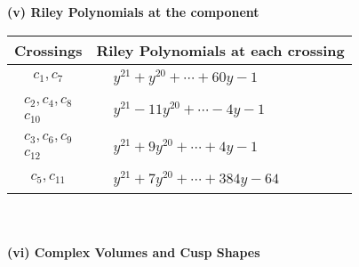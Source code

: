 \documentclass[1p]{elsarticle_modified}
\theoremstyle{definition}
\begin{document}
\newpage\renewcommand{\arraystretch}{1}
\flushleft \textbf{(v) Riley Polynomials at the component}\newline \\
\begin{tabular}{m{50pt}|m{274pt}}
Crossings & \hspace{64pt}Riley Polynomials at each crossing \\
\hline $$\begin{aligned}c_{1},c_{7}\end{aligned}$$&$\begin{aligned}
&y^{21}+y^{20}+\cdots+60 y-1
\end{aligned}$\\
\hline $$\begin{aligned}c_{2},c_{4},c_{8}\\c_{10}\end{aligned}$$&$\begin{aligned}
&y^{21}-11 y^{20}+\cdots-4 y-1
\end{aligned}$\\
\hline $$\begin{aligned}c_{3},c_{6},c_{9}\\c_{12}\end{aligned}$$&$\begin{aligned}
&y^{21}+9 y^{20}+\cdots+4 y-1
\end{aligned}$\\
\hline $$\begin{aligned}c_{5},c_{11}\end{aligned}$$&$\begin{aligned}
&y^{21}+7 y^{20}+\cdots+384 y-64
\end{aligned}$\\
\hline
\end{tabular}\\~\\
\newpage\flushleft \textbf{(vi) Complex Volumes and Cusp Shapes}
\end{document}
